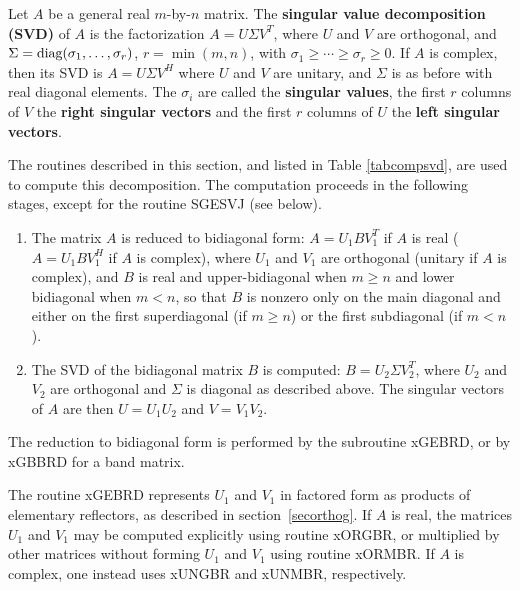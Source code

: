 Let $A$ be a general real $m$-by-$n$ matrix. The {\bf singular value
decomposition (SVD)} of $A$ is the factorization  $A=U \Sigma V^T$, where
$U$ and $V$ are orthogonal, and
$\Sigma = {\mbox {\rm diag}} ( \sigma_1 , \ldots , \sigma_r )$, $r = \min (m,n)$,
with $\sigma_1 \geq \cdots \geq \sigma_r \geq 0$. If $A$ is complex, then
its SVD is $A=U \Sigma V^H$ where $U$ and $V$ are unitary,
and $\Sigma$ is as before with real
diagonal elements.
The $\sigma_i$ are called the {\bf singular values},
the first $r$ columns of $V$
the {\bf right singular vectors} and
the first $r$ columns of $U$
the {\bf left singular vectors}.

The routines described in this section, and listed in Table \ref{tabcompsvd},
are used to compute this decomposition.
The computation proceeds in the following stages,
except for the routine SGESVJ (see below).

\begin{enumerate}

\item The matrix $A$ is reduced to bidiagonal
form: $A=U_1 B V_1^T$ if
$A$ is real ($A=U_1 B V_1^H$ if $A$ is complex), where $U_1$ and $V_1$
are orthogonal (unitary if $A$ is complex), and $B$ is real and
upper-bidiagonal when $m \geq n$ and lower bidiagonal when $m < n$, so
that $B$ is nonzero only on the main diagonal and either on the first
superdiagonal (if $m \geq n$) or the first subdiagonal (if $m<n$).

\item The SVD of the bidiagonal matrix $B$ is computed: $B=U_2 \Sigma V_2^T$,
where $U_2$ and $V_2$ are orthogonal and $\Sigma$ is diagonal as described
above. The singular vectors of $A$ are then $U = U_1 U_2$ and
$V = V_1 V_2$.

\end{enumerate}

The reduction to bidiagonal form is performed by the subroutine xGEBRD,
 or by xGBBRD
for a band matrix.

The routine xGEBRD represents
$U_1$ and $V_1$ in factored form as products of elementary reflectors,
as described in section~\ref{secorthog}.
If $A$ is real,
the matrices $U_1$ and $V_1$ may be computed explicitly using routine xORGBR,
or multiplied by other matrices without forming $U_1$ and $V_1$ using routine xORMBR.
If $A$ is complex, one instead uses xUNGBR
and xUNMBR, respectively.

